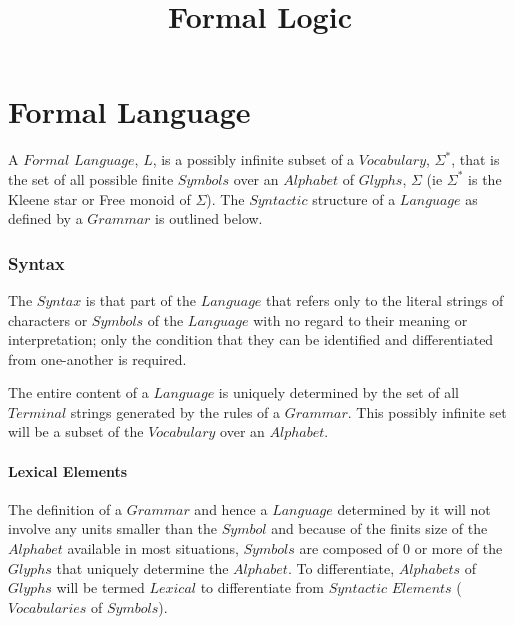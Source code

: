 \documentclass{article}
\begin{document}
\setcounter{tocdepth}{3}


\title{Formal Logic}
\date{}
\maketitle


\tableofcontents


\part{Formal Language}

A $Formal$ $Language$, $L$, is a possibly infinite subset of a
$Vocabulary$, $\Sigma^*$, that is the set of all possible finite
$Symbols$ over an $Alphabet$ of $Glyphs$, $\Sigma$ (ie $\Sigma^*$ is
the Kleene star or Free monoid of $\Sigma$). The $Syntactic$ structure
of a $Language$ as defined by a $Grammar$ is outlined below.

\section{Syntax}

The $Syntax$ is that part of the $Language$ that refers only to the
literal strings of characters or $Symbols$ of the $Language$ with no
regard to their meaning or interpretation; only the condition that
they can be identified and differentiated from one-another is
required.

The entire content of a $Language$ is uniquely determined by the set
of all $Terminal$ strings generated by the rules of a $Grammar$. This
possibly infinite set will be a subset of the $Vocabulary$ over an
$Alphabet$.

\subsection{Lexical Elements}

The definition of a $Grammar$ and hence a $Language$ determined by it
will not involve any units smaller than the $Symbol$ and because of
the finits size of the $Alphabet$ available in most situations,
$Symbols$ are composed of 0 or more of the $Glyphs$ that uniquely
determine the $Alphabet$. To differentiate, $Alphabets$ of $Glyphs$
will be termed $Lexical$ to differentiate from $Syntactic$ $Elements$
($Vocabularies$ of $Symbols$).
\end{document}
